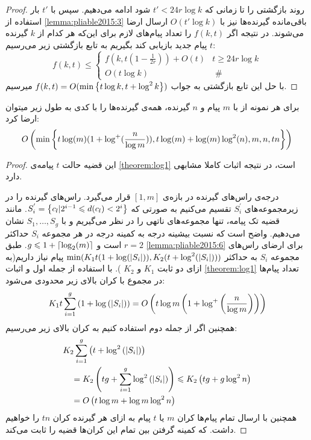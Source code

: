 \begin{proof}
	روند بازگشتی را تا زمانی که
	$t' < 24r \log k$
	شود ادامه می‌دهیم. سپس با 
	$t'$
	بار استفاده از 
	\autoref{lemma:pliable2015:3}
	باقی‌مانده گیرنده‌ها نیز با
	$O(t' \log k)$
	ارسال ارضا می‌شوند. در نتیجه اگر
	$f(k, t)$
	را تعداد پیام‌های لازم برای این‌که هر کدام از
	$k$
	گیرنده
	$t$
	پیام جدید بازیابی کند بگیریم به تابع بازگشتی زیر می‌رسیم:
	\begin{equation}
		f(k, t) \leq \begin{cases}f\left(k, t\left(1-\frac{1}{2 r}\right)\right)+O(t) & t \geq 24 r \log k \\ O(t \log k) & \text { \# }\end{cases}
	\end{equation}
	با حل این تابع بازگشتی به جواب
	$f(k, t) = O(\min\left\{ t \log k, t + \log^2 k \right\})$
	میرسیم.
\end{proof}

\begin{theorem}
	\cite{pliable2015paper}
	\label{thm:pliable2015_7}
	برای هر نمونه از
	با
	$m$
	پیام و
	$n$
	گیرنده، همه‌ی گیرنده‌ها را با کدی به طول زیر میتوان ارضا کرد:
	\begin{equation}
		O\left( \min\left\{  t \log(m) (1 + \log^{+}(\dfrac{n}{\log m})), t \log(m) + \log(m) \log^2(n), m, n, tn \right\}\right)
	\end{equation}
\end{theorem}
\begin{proof}
	این قضیه حالت
	$t$
	پیامه‌ی
	\autoref{theorem:log1}
	است، در نتیجه اثبات کاملا مشابهی دارد.
	
	درجه‌ی راس‌های گیرنده در بازه‌ی
	$[1, m]$
	قرار می‌گیرد. راس‌های گیرنده را در زیرمجموعه‌های
	$S_i^{'}$
	تقسیم می‌کنیم به صورتی که
	$S_i^{'} = \left\{ c_l | 2^{i - 1} \leqslant d(c_l) < 2^i  \right\}$.
	مانند قضیه تک پیامه، تنها مجموعه‌های ناتهی را در نظر می‌گیریم و با
	$S_1, \ldots, S_g$
	نشان می‌دهیم. واضح است که نسبت بیشینه درجه به کمینه درجه در هر مجموعه
	$S_i$
	حداکثر
	$r = 2$
	است و
	$g \leqslant 1 + \left\lceil{\log_2(m)}\right\rceil$.
	طبق
	\autoref{lemma:pliable2015:6}
	برای ارضای راس‌های مجموعه‌
	$S_i$
	به حداکثر
	$\min (K_1 t (1 + \log(\left|{S_i}\right|)), K_2(t + \log^2(\left|{S_i}\right|)))$
	پیام نیاز داریم(به ازای دو ثابت 
	$K_1$
	و
	$K_2$
	). با استفاده از جمله اول و اثبات
	\autoref{theorem:log1}
	تعداد پیام‌ها در مجموع با کران بالای زیر محدودی می‌شود:
	$$
	K_1 t \sum_{i=1}^g\left(1+\log \left(\left|{S_i}\right|\right)\right)=O\left(t \log m\left(1+\log ^{+}\left(\frac{n}{\log m}\right)\right)\right)
	$$
	همچنین اگر از جمله دوم استفاده کنیم به کران بالای زیر می‌رسیم:
	$$
	\begin{aligned}
		& K_2 \sum_{i=1}^g\left(t+\log ^2\left(\left|{S_i}\right|\right)\right) \\
		& \quad=K_2\left(t g+\sum_{i=1}^g \log ^2\left(\left|{S_i}\right|\right)\right) \leqslant K_2\left(t g+g \log ^2 n\right) \\
		& \quad=O\left(t \log m+\log m \log ^2 n\right)
	\end{aligned}
	$$
	همچنین با ارسال تمام پیام‌ها کران $m$ یا $t$ پیام به ازای هر گیرنده کران $tn$ را خواهیم داشت. که کمینه گرفتن بین تمام این کران‌ها قضیه را ثابت می‌کند.
\end{proof}

